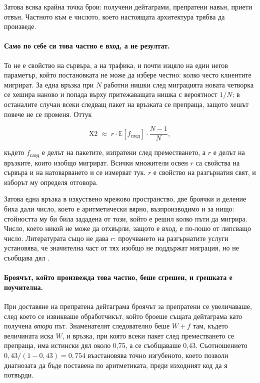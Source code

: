 Затова всяка крайна точка брои: получени дейтаграми, препратени навън, приети отвън. Частното
 към  е числото, което настоящата архитектура трябва да
произведе.

\paragraph{Само по себе си това частно е вход, а не резултат.} То не е свойство на сървъра, а на
трафика, и почти изцяло на един негов параметър, който постановката не може да избере честно: колко
често клиентите мигрират. За една връзка при \(N\) работни нишки след миграцията новата четворка се
хешира наново и попада върху притежаващата нишка с вероятност \(1/N\); в останалите случаи всеки
следващ пакет на връзката се препраща, защото хешът повече не се променя. Оттук

\[ \text{X2} \;\approx\; r \cdot \mathbb{E}[f_{\text{след}}] \cdot \frac{N-1}{N}, \]

където \(f_{\text{след}}\) е делът на пакетите, изпратени след преместването, а \(r\) е делът на
връзките, които изобщо мигрират. Всички множители освен \(r\) са свойства на сървъра и на
натоварването и се измерват тук. \(r\) е свойство на разгърнатия свят, и изборът му определя
отговора.

Затова една връзка в изкуствено мрежово пространство, две броячки и деление биха дали число, което е
аритметически вярно, възпроизводимо и за нищо: стойността му би била зададена от този, който е решил
колко пъти да мигрира. Число, което никой не може да отхвърли, защото е вход, е по-лошо от липсващо
число. Литературата също не дава \(r\): проучването на разгърнатите услуги установява, че значителна
част от тях изобщо не поддържат миграция, но не съобщава дял \cite{buchet2025migration}.

\paragraph{Броячът, който произвежда това частно, беше сгрешен, и грешката е поучителна.} При
доставяне на препратена дейтаграма броячът за препратени се увеличаваше, след което се извикваше
обработчикът, който броеше същата дейтаграма като получена \emph{втори} път. Знаменателят
следователно беше \(W+f\) там, където величината иска \(W\), и връзка, при която всеки пакет след
преместването се препраща, има истински дял около 0,75, а се съобщаваше 0,43.
Съотношението \(0{,}43/(1-0{,}43)=0{,}754\) възстановява точно изгубеното, което позволи диагнозата
да бъде поставена по аритметиката, преди изходният код да я потвърди.

